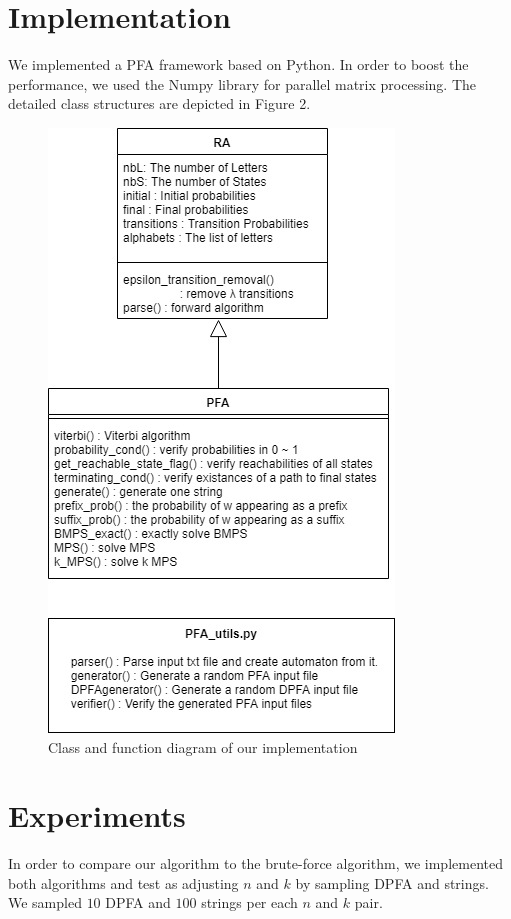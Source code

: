 \documentclass{article}
\theoremstyle{plain}
\theoremstyle{definition}
\theoremstyle{remark}
\begin{document}
\section{Implementation}
We implemented a PFA framework based on Python. In order to boost the performance, we used the Numpy library for parallel matrix processing. The detailed class structures are depicted in Figure 2.
\begin{figure}[htbp]
\begin{center}
\includegraphics[scale=0.4]{implementation_diagram}
\caption{Class and function diagram of our implementation} \label{fig:label}
\end{center}
\end{figure}
\section{Experiments}
In order to compare our algorithm to the brute-force algorithm, we implemented both algorithms and test as adjusting $n$ and $k$ by sampling DPFA and strings. We sampled $10$ DPFA and $100$ strings per each $n$ and $k$ pair. 
\end{document}
